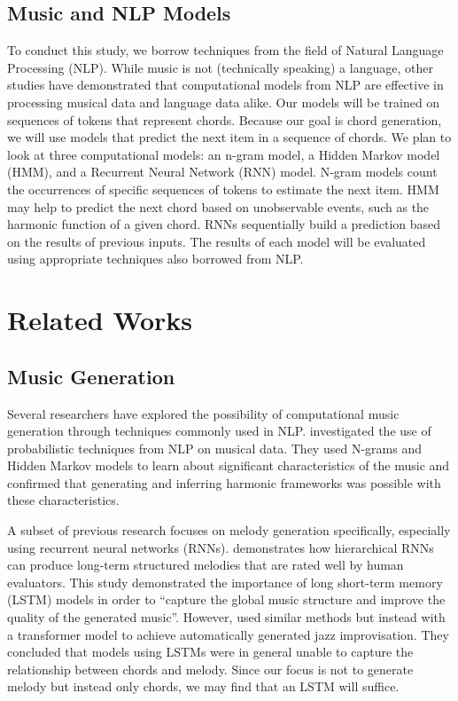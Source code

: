 \documentclass[11pt,a4paper]{article}
\begin{document}
\subsection{Music and NLP Models}
To conduct this study, we borrow techniques from the field of Natural Language Processing (NLP). While music is not (technically speaking) a language, other studies have demonstrated that computational models from NLP are effective in processing musical data and language data alike. Our models will be trained on sequences of tokens that represent chords. Because our goal is chord generation, we will use models that predict the next item in a sequence of chords. We plan to look at three computational models: an n-gram model, a Hidden Markov model (HMM), and a Recurrent Neural Network (RNN) model. N-gram models count the occurrences of specific sequences of tokens to estimate the next item. HMM may help to predict the next chord based on unobservable events, such as the harmonic function of a given chord. RNNs sequentially build a prediction based on the results of previous inputs. The results of each model will be evaluated using appropriate techniques also borrowed from NLP. 


\section{Related Works}
\subsection{Music Generation}
Several researchers have explored the possibility of computational music generation through techniques commonly used in NLP. \citet{ponsford1999} investigated the use of probabilistic techniques from NLP on musical data. They used N-grams and Hidden Markov models to learn about significant characteristics of the music and confirmed that generating and inferring harmonic frameworks was possible with these characteristics. 

A subset of previous research focuses on melody generation specifically, especially using recurrent neural networks (RNNs). \citet{wu2019} demonstrates how hierarchical RNNs can produce long-term structured melodies that are rated well by human evaluators. This study demonstrated the importance of long short-term memory (LSTM) models in order to “capture the global music structure and improve the quality of the generated music”. However, \citet{madaghiele2021} used similar methods but instead with a transformer model to achieve automatically generated jazz improvisation. They concluded that models using LSTMs were in general unable to capture the relationship between chords and melody. Since our focus is not to generate melody but instead only chords, we may find that an LSTM will suffice. 
\end{document}
